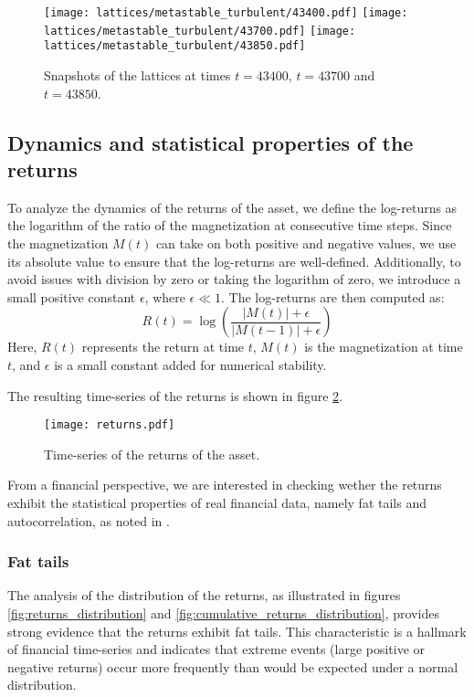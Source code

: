 \begin{figure}[H]
    \centering
    \texttt{[image: lattices/metastable\_turbulent/43400.pdf]}
    \texttt{[image: lattices/metastable\_turbulent/43700.pdf]}
    \texttt{[image: lattices/metastable\_turbulent/43850.pdf]}
    \caption{Snapshots of the lattices at times $t=43400$, $t=43700$ and $t=43850$.}
    \label{fig:lattices}
\end{figure}

\subsection{Dynamics and statistical properties of the returns}
To analyze the dynamics of the returns of the asset, we define the log-returns as the logarithm of the ratio of the magnetization at consecutive time steps. Since the magnetization $M(t)$ can take on both positive and negative values, we use its absolute value to ensure that the log-returns are well-defined. Additionally, to avoid issues with division by zero or taking the logarithm of zero, we introduce a small positive constant $\epsilon$, where $\epsilon \ll 1$. The log-returns are then computed as:
\begin{equation}
    R(t) = \log\left(\frac{|M(t)| + \epsilon}{|M(t-1)| + \epsilon}\right)
\end{equation}
Here, $R(t)$ represents the return at time $t$, $M(t)$ is the magnetization at time $t$, and $\epsilon$ is a small constant added for numerical stability.

The resulting time-series of the returns is shown in figure \ref{fig:returns}.

\begin{figure}[H]
    \centering
    \texttt{[image: returns.pdf]}
    \caption{Time-series of the returns of the asset.}
    \label{fig:returns}
\end{figure}

From a financial perspective, we are interested in checking wether the returns exhibit the statistical properties of real financial data, namely fat tails and autocorrelation, as noted in \cite{bouchaud2000theory}.

\subsubsection{Fat tails}
The analysis of the distribution of the returns, as illustrated in figures \ref{fig:returns_distribution} and \ref{fig:cumulative_returns_distribution}, provides strong evidence that the returns exhibit fat tails. This characteristic is a hallmark of financial time-series and indicates that extreme events (large positive or negative returns) occur more frequently than would be expected under a normal distribution.

